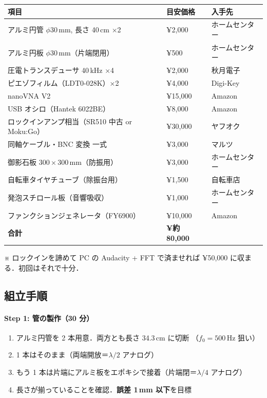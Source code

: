 \documentclass[11pt,a4paper]{article}
\begin{document}
\begin{center}
\begin{tabular}{lll}
\toprule
項目 & 目安価格 & 入手先 \\
\midrule
アルミ円管 $\phi 30$\,mm, 長さ 40\,cm ×2 & ¥2,000 & ホームセンター \\
アルミ円板 $\phi 30$\,mm（片端閉用）& ¥500 & ホームセンター \\
圧電トランスデューサ 40\,kHz ×4 & ¥2,000 & 秋月電子 \\
ピエゾフィルム（LDT0-028K）×2 & ¥4,000 & Digi-Key \\
nanoVNA V2 & ¥15,000 & Amazon \\
USB オシロ（Hantek 6022BE）& ¥8,000 & Amazon \\
ロックインアンプ相当（SR510 中古 or Moku:Go）& ¥30,000 & ヤフオク \\
同軸ケーブル・BNC 変換 一式 & ¥3,000 & マルツ \\
御影石板 $300\times300$\,mm（防振用）& ¥3,000 & ホームセンター \\
自転車タイヤチューブ（除振台用）& ¥1,500 & 自転車店 \\
発泡スチロール板（音響吸収）& ¥1,000 & ホームセンター \\
ファンクションジェネレータ（FY6900）& ¥10,000 & Amazon \\
\midrule
\textbf{合計} & \textbf{¥約 80,000} & \\
\bottomrule
\end{tabular}
\end{center}

※ ロックインを諦めて PC の Audacity + FFT で済ませれば
¥50,000 に収まる．初回はそれで十分．

\subsection{組立手順}

\paragraph{Step 1: 管の製作（30 分）}

\begin{enumerate}
\item アルミ円管を 2 本用意．両方とも長さ 34.3\,cm に切断
（$f_0 = 500$\,Hz 狙い）
\item 1 本はそのまま（両端開放＝$\lambda/2$ アナログ）
\item もう 1 本は片端にアルミ板をエポキシで接着（片端閉＝$\lambda/4$ アナログ）
\item 長さが揃っていることを確認．\textbf{誤差 1\,mm 以下}を目標
\end{enumerate}
\end{document}
